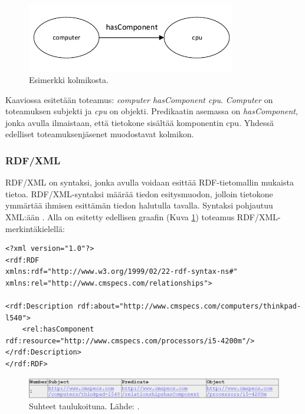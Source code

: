 \documentclass[finnish, 12pt, a4paper, elec, utf8, pdfa, online]{aaltothesis}
\begin{document}
\begin{figure}[htb]
\centering
\includegraphics[height=3cm]{images/RDF-triplet.pdf}
\caption{Esimerkki kolmikosta. \label{images/RDF-triplet1}}
\end{figure}

Kaaviossa esitetään toteamus: \textit{computer hasComponent cpu}. \textit{Computer} on toteamuksen subjekti ja \textit{cpu} on objekti. Predikaatin asemassa on \textit{hasComponent}, jonka avulla ilmaistaan, että tietokone sisältää komponentin cpu. Yhdessä edelliset toteamuksenjäsenet muodostavat kolmikon.



\subsubsection{RDF/XML}
RDF/XML on syntaksi, jonka avulla voidaan esittää RDF-tietomallin mukaista tietoa. RDF/XML-syntaksi määrää tiedon esitysmuodon, jolloin tietokone ymmärtää ihmisen esittämän tiedon halutulla tavalla. Syntaksi pohjautuu XML:ään \cite{RDF_XML}. Alla on esitetty edellisen graafin (Kuva \ref{images/RDF-triplet1}) toteamus RDF/XML-merkintäkielellä:

\vskip 0.75cm
\begin{lstlisting}[style=codeblock,caption={RDF/XML syntaksiesimerkki.},captionpos=b,label={rdf_esim}]
<?xml version="1.0"?>
<rdf:RDF
xmlns:rdf="http://www.w3.org/1999/02/22-rdf-syntax-ns#"
xmlns:rel="http://www.cmspecs.com/relationships">

<rdf:Description rdf:about="http://www.cmspecs.com/computers/thinkpad-l540">
    <rel:hasComponent rdf:resource="http://www.cmspecs.com/processors/i5-4200m"/>
</rdf:Description>
</rdf:RDF>
\end{lstlisting}
\vskip 0.75cm

\begin{figure}[htb]
\centering
\includegraphics[width=15cm]{images/RDF-valid.PNG}
\caption{Suhteet taulukoituna. Lähde: \cite{W3C_RDF_validator}. \label{images/RDF-valid}}
\end{figure}
\end{document}
